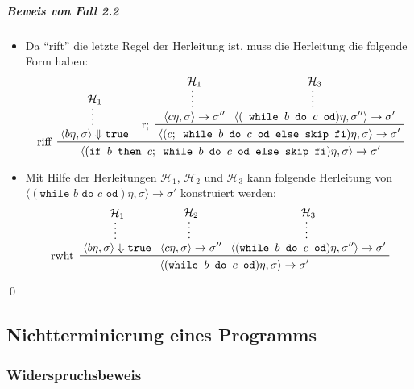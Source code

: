 					\subparagraph{Beweis von Fall 2.2}
						\begin{itemize}
							\item Da \enquote{rift} die letzte Regel der Herleitung ist, muss die Herleitung die folgende Form haben:
								\begin{equation*}
									\prftree[l]
									{ riff }
									{ \prfsummary{\mathcal{H} _ 1}{\langle b\eta, \sigma \rangle \Downarrow \texttt{true}} }
									{
										\prftree[l]
										{ r; }
										{ \prfsummary{\mathcal{H} _ 1}{\langle c\eta, \sigma \rangle \rightarrow \sigma''} }
										{ \prfsummary{\mathcal{H} _ 3}{\langle (\texttt{ while } b \texttt{ do } c \texttt{ od})\eta, \sigma'' \rangle \rightarrow \sigma' } }
										{ \langle (c ; \texttt{ while } b \texttt{ do } c \texttt{ od else skip fi}) \eta, \sigma \rangle \rightarrow \sigma' }
									}
									{ \langle (\texttt{if } b \texttt{ then } c ; \texttt{ while } b \texttt{ do } c \texttt{ od else skip fi})\eta, \sigma \rangle \rightarrow \sigma' }
								\end{equation*}
							\item Mit Hilfe der Herleitungen $ \mathcal{H} _ 1 $, $ \mathcal{H} _ 2 $ und $ \mathcal{H} _ 3 $ kann folgende Herleitung von \\ $ \langle (\texttt{while } b \texttt{ do } c \texttt{ od}) \eta, \sigma \rangle \rightarrow \sigma' $ konstruiert werden:
								\begin{equation*}
									\prftree[l]
									{ rwht }
									{ \prfsummary{\mathcal{H} _ 1}{\langle b\eta, \sigma \rangle \Downarrow \texttt{true}} }
									{ \prfsummary{\mathcal{H} _ 2}{\langle c\eta, \sigma \rangle \rightarrow \sigma''} }
									{ \prfsummary{\mathcal{H} _ 3}{\langle (\texttt{while } b \texttt{ do } c \texttt{ od}) \eta, \sigma'' \rangle \rightarrow \sigma'}  }
									{ \langle (\texttt{while } b \texttt{ do } c \texttt{ od}) \eta, \sigma \rangle \rightarrow \sigma' }
								\end{equation*}
						\end{itemize}

						\qed

		\subsection{Nichtterminierung eines Programms}
			\subsubsection{Widerspruchsbeweis}
